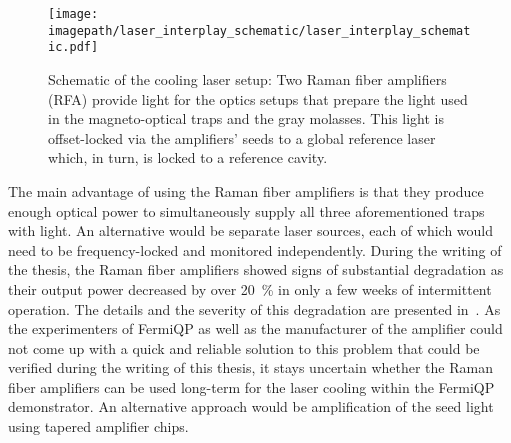 \begin{figure}
    \centering
    \texttt{[image: \\imagepath/laser\_interplay\_schematic/laser\_interplay\_schematic.pdf]}
    \caption{Schematic of the cooling laser setup: Two Raman fiber amplifiers  (RFA) provide light for the optics setups that prepare the light used in the magneto-optical traps and the gray molasses. This light is offset-locked via the amplifiers' seeds to a global reference laser which, in turn, is locked to a reference cavity.
    }\label{fig:laser_interplay_schematic}
\end{figure}

The main advantage of using the Raman fiber amplifiers is that they produce enough optical power to simultaneously supply all three aforementioned traps with light. An alternative would be separate laser sources, each of which would need to be frequency-locked and monitored independently. During the writing of the thesis, the Raman fiber amplifiers showed signs of substantial degradation as their output power decreased by over \SI{20}{\percent} in only a few weeks of intermittent operation. The details and the severity of this degradation are presented in~\cite{qesja_design_2022}. As the experimenters of FermiQP as well as the manufacturer of the amplifier could not come up with a quick and reliable solution to this problem that could be verified during the writing of this thesis, it stays uncertain whether the Raman fiber amplifiers can be used long-term for the laser cooling within the FermiQP demonstrator. An alternative approach would be amplification of the seed light using tapered amplifier chips.

